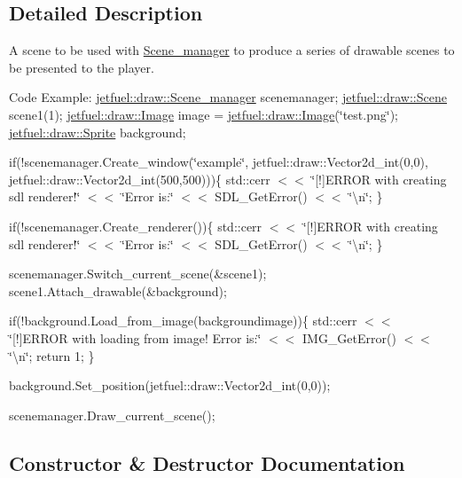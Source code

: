 \subsection{Detailed Description}
A scene to be used with \hyperlink{classjetfuel_1_1draw_1_1Scene__manager}{Scene\+\_\+manager} to produce a series of drawable scenes to be presented to the player.

Code Example\+: \hyperlink{classjetfuel_1_1draw_1_1Scene__manager}{jetfuel\+::draw\+::\+Scene\+\_\+manager} scenemanager; \hyperlink{classjetfuel_1_1draw_1_1Scene}{jetfuel\+::draw\+::\+Scene} scene1(1); \hyperlink{classjetfuel_1_1draw_1_1Image}{jetfuel\+::draw\+::\+Image} image = \hyperlink{classjetfuel_1_1draw_1_1Image}{jetfuel\+::draw\+::\+Image}(\char`\"{}test.\+png\char`\"{}); \hyperlink{classjetfuel_1_1draw_1_1Sprite}{jetfuel\+::draw\+::\+Sprite} background;

if(!scenemanager.Create\+\_\+window(\char`\"{}example\char`\"{}, jetfuel\+::draw\+::\+Vector2d\+\_\+int(0,0), jetfuel\+::draw\+::\+Vector2d\+\_\+int(500,500)))\{ std\+::cerr $<$$<$ \char`\"{}\mbox{[}!\mbox{]}\+E\+R\+R\+O\+R with creating sdl renderer!\char`\"{} $<$$<$ \char`\"{}\+Error is\+:\char`\"{} $<$$<$ S\+D\+L\+\_\+\+Get\+Error() $<$$<$ \char`\"{}\textbackslash{}n\char`\"{}; \}

if(!scenemanager.Create\+\_\+renderer())\{ std\+::cerr $<$$<$ \char`\"{}\mbox{[}!\mbox{]}\+E\+R\+R\+O\+R with creating sdl renderer!\char`\"{} $<$$<$ \char`\"{}\+Error is\+:\char`\"{} $<$$<$ S\+D\+L\+\_\+\+Get\+Error() $<$$<$ \char`\"{}\textbackslash{}n\char`\"{}; \}

scenemanager.\+Switch\+\_\+current\+\_\+scene(\&scene1); scene1.\+Attach\+\_\+drawable(\&background);

if(!background.Load\+\_\+from\+\_\+image(backgroundimage))\{ std\+::cerr $<$$<$ \char`\"{}\mbox{[}!\mbox{]}\+E\+R\+R\+O\+R with loading from image! Error is\+:\char`\"{} $<$$<$ I\+M\+G\+\_\+\+Get\+Error() $<$$<$ \char`\"{}\textbackslash{}n\char`\"{}; return 1; \}

background.\+Set\+\_\+position(jetfuel\+::draw\+::\+Vector2d\+\_\+int(0,0));

scenemanager.\+Draw\+\_\+current\+\_\+scene(); 

\subsection{Constructor \& Destructor Documentation}
\mbox{\label{classjetfuel_1_1draw_1_1Scene_ad27192ba7e5f0cb23b55f5ba067cbe94}} 
